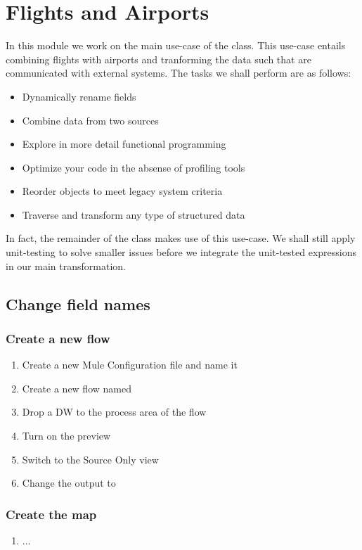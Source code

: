 \chapter{Flights and Airports}

In this module we work on the main use-case of the class.  This use-case entails combining flights with airports and tranforming the data such that are communicated with external systems. The tasks we shall perform are as follows:
\begin{itemize}
\item Dynamically rename fields
\item Combine data from two sources
\item Explore in more detail functional programming
\item Optimize your code in the absense of profiling tools
\item Reorder objects to meet legacy system criteria
\item Traverse and transform any type of structured data
\end{itemize}
In fact, the remainder of the class makes use of this use-case.  We shall still apply unit-testing to solve smaller issues before we integrate the unit-tested expressions in our main transformation. 

\section{Change field names}

\subsection{Create a new flow}
\begin{enumerate}
\item Create a new Mule Configuration file and name it 
\item Create a new flow named 
\item Drop a DW to the process area of the flow
\item Turn on the preview
\item Switch to the Source Only view
\item Change the output to 
\end{enumerate}

\subsection{Create the map}
\begin{enumerate}[resume*]
\item ...
\end{enumerate}

